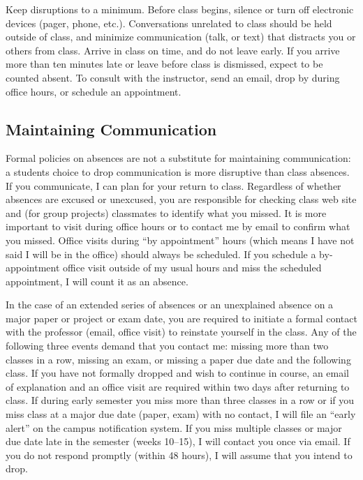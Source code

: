 \documentclass[]{article}
\begin{document}
Keep disruptions to a minimum. Before class begins, silence or turn off
electronic devices (pager, phone, etc.). Conversations unrelated to
class should be held outside of class, and minimize communication (talk,
or text) that distracts you or others from class. Arrive in class on
time, and do not leave early. If you arrive more than ten minutes late
or leave before class is dismissed, expect to be counted absent. To
consult with the instructor, send an email, drop by during office hours,
or schedule an appointment.

\subsection{Maintaining Communication}\label{maintaining-communication}

Formal policies on absences are not a substitute for maintaining
communication: a students choice to drop communication is more
disruptive than class absences. If you communicate, I can plan for your
return to class. Regardless of whether absences are excused or
unexcused, you are responsible for checking class web site and (for
group projects) classmates to identify what you missed. It is more
important to visit during office hours or to contact me by email to
confirm what you missed. Office visits during ``by appointment'' hours
(which means I have not said I will be in the office) should always be
scheduled. If you schedule a by-appointment office visit outside of my
usual hours and miss the scheduled appointment, I will count it as an
absence.

In the case of an extended series of absences or an unexplained absence
on a major paper or project or exam date, you are required to initiate a
formal contact with the professor (email, office visit) to reinstate
yourself in the class. Any of the following three events demand that you
contact me: missing more than two classes in a row, missing an exam, or
missing a paper due date and the following class. If you have not
formally dropped and wish to continue in course, an email of explanation
and an office visit are required within two days after returning to
class. If during early semester you miss more than three classes in a
row or if you miss class at a major due date (paper, exam) with no
contact, I will file an ``early alert'' on the campus notification
system. If you miss multiple classes or major due date late in the
semester (weeks 10--15), I will contact you once via email. If you do
not respond promptly (within 48 hours), I will assume that you intend to
drop.
\end{document}

